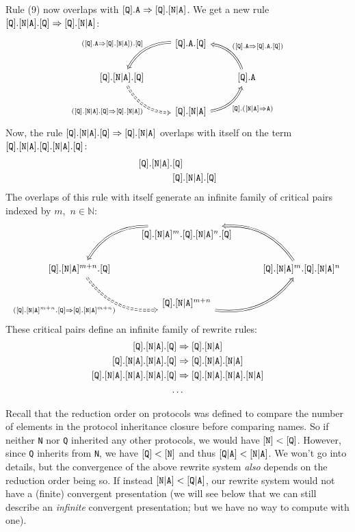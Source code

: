\documentclass[../generics]{subfiles}
\begin{document}
\begin{example}
Rule (9) now overlaps with $[\texttt{Q}].\texttt{A}\Rightarrow[\texttt{Q}].[\texttt{N}|\texttt{A}]$. We get a new rule $[\texttt{Q}].[\texttt{N}|\texttt{A}].[\texttt{Q}]\Rightarrow [\texttt{Q}].[\texttt{N}|\texttt{A}]$:
\[
\FourLoopDerived%
{\protosym{Q}.\texttt{A}.\protosym{Q}}%
{\protosym{Q}.\assocsym{N}{A}.\protosym{Q}}%
{\protosym{Q}.\assocsym{N}{A}}%
{\protosym{Q}.\texttt{A}}%
{(\protosym{Q}.\texttt{A}\Rightarrow\protosym{Q}.\assocsym{N}{A}).\protosym{Q}}%
{(\protosym{Q}.\assocsym{N}{A}.\protosym{Q}\Rightarrow\protosym{Q}.\assocsym{N}{A})}%
{\protosym{Q}.(\assocsym{N}{A}\Rightarrow\texttt{A})}%
{(\protosym{Q}.\texttt{A}\Rightarrow\protosym{Q}.\texttt{A}.\protosym{Q})}
\]
Now, the rule $[\texttt{Q}].[\texttt{N}|\texttt{A}].[\texttt{Q}]\Rightarrow [\texttt{Q}].[\texttt{N}|\texttt{A}]$ overlaps with itself on the term $[\texttt{Q}].[\texttt{N}|\texttt{A}].[\texttt{Q}].[\texttt{N}|\texttt{A}].[\texttt{Q}]$:
\begin{align*}
[\texttt{Q}].[\texttt{N}|\texttt{A}].&[\texttt{Q}]\\
&[\texttt{Q}].[\texttt{N}|\texttt{A}].[\texttt{Q}]
\end{align*}
The overlaps of this rule with itself generate an infinite family of critical pairs indexed by $m$,~$n\in\mathbb{N}$:
\[
\FourLoopDerived%
{\protosym{Q}.\assocsym{N}{A}^m.\protosym{Q}.\assocsym{N}{A}^n.\protosym{Q}}%
{\protosym{Q}.\assocsym{N}{A}^{m+n}.\protosym{Q}}%
{\protosym{Q}.\assocsym{N}{A}^{m+n}}%
{\protosym{Q}.\assocsym{N}{A}^m.\protosym{Q}.\assocsym{N}{A}^n}%
{}%
{(\protosym{Q}.\assocsym{N}{A}^{m+n}.\protosym{Q}\Rightarrow\protosym{Q}.\assocsym{N}{A}^{m+n})}%
{}%
{}
\]
These critical pairs define an infinite family of rewrite rules:
\begin{gather*}
\protosym{Q}.\assocsym{N}{A}.\protosym{Q}\Rightarrow\protosym{Q}.\assocsym{N}{A}\\
\protosym{Q}.\assocsym{N}{A}.\assocsym{N}{A}.\protosym{Q}\Rightarrow\protosym{Q}.\assocsym{N}{A}.\assocsym{N}{A}\\
\protosym{Q}.\assocsym{N}{A}.\assocsym{N}{A}.\assocsym{N}{A}.\protosym{Q}\Rightarrow\protosym{Q}.\assocsym{N}{A}.\assocsym{N}{A}.\assocsym{N}{A}\\
\ldots
\end{gather*}

Recall that the reduction order on protocols was defined to compare the number of elements in the protocol inheritance closure before comparing names. So if neither \texttt{N} nor \texttt{Q} inherited any other protocols, we would have $[\texttt{N}]<[\texttt{Q}]$. However, since \texttt{Q} inherits from \texttt{N}, we have $[\texttt{Q}]<[\texttt{N}]$ and thus $[\texttt{Q}|\texttt{A}]<[\texttt{N}|\texttt{A}]$. We won't go into details, but the convergence of the above rewrite system \emph{also} depends on the reduction order being so. If instead $[\texttt{N}|\texttt{A}]<[\texttt{Q}|\texttt{A}]$, our rewrite system would not have a (finite) convergent presentation (we will see below that we can still describe an \emph{infinite} convergent presentation; but we have no way to compute with one).


\end{example}
\end{document}
